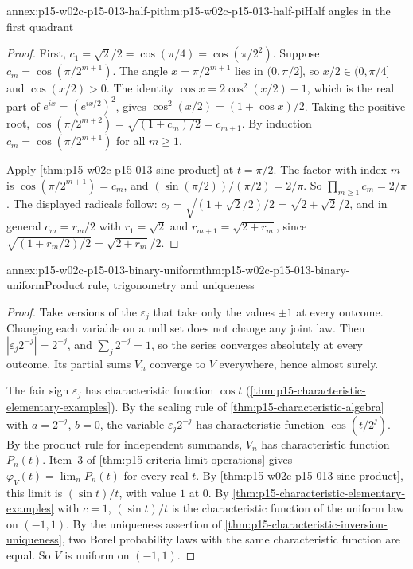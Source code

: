 \begin{annexitem}{annex:p15-w02c-p15-013-half-pi}{thm:p15-w02c-p15-013-half-pi}{Half angles in the first quadrant}
\begin{proof}
First, \(c_1=\sqrt2/2=\cos(\pi/4)=\cos(\pi/2^2)\). Suppose
\(c_m=\cos(\pi/2^{m+1})\). The angle \(x=\pi/2^{m+1}\) lies in
\((0,\pi/2]\), so \(x/2\in(0,\pi/4]\) and \(\cos(x/2)>0\). The identity
\(\cos x=2\cos^2(x/2)-1\), which is the real part of
\(e^{ix}=(e^{ix/2})^2\), gives \(\cos^2(x/2)=(1+\cos x)/2\). Taking the
positive root, \(\cos(\pi/2^{m+2})=\sqrt{(1+c_m)/2}=c_{m+1}\). By induction
\(c_m=\cos(\pi/2^{m+1})\) for all \(m\geq1\).

Apply \cref{thm:p15-w02c-p15-013-sine-product} at \(t=\pi/2\). The factor
with index \(m\) is \(\cos(\pi/2^{m+1})=c_m\), and
\((\sin(\pi/2))/(\pi/2)=2/\pi\). So \(\prod_{m\geq1}c_m=2/\pi\). The displayed
radicals follow: \(c_2=\sqrt{(1+\sqrt2/2)/2}=\sqrt{2+\sqrt2}/2\), and in
general \(c_m=r_m/2\) with \(r_1=\sqrt2\) and \(r_{m+1}=\sqrt{2+r_m}\), since
\(\sqrt{(1+r_m/2)/2}=\sqrt{2+r_m}/2\).
\end{proof}
\end{annexitem}

\begin{annexitem}{annex:p15-w02c-p15-013-binary-uniform}{thm:p15-w02c-p15-013-binary-uniform}{Product rule, trigonometry and uniqueness}
\begin{proof}
Take versions of the \(\varepsilon_j\) that take only the values \(\pm1\)
at every outcome. Changing each variable on a null set does not change
any joint law. Then \(|\varepsilon_j2^{-j}|=2^{-j}\), and
\(\sum_j2^{-j}=1\), so the series converges absolutely at every outcome.
Its partial sums \(V_n\) converge to \(V\) everywhere, hence almost surely.

The fair sign \(\varepsilon_j\) has characteristic function \(\cos t\)
(\cref{thm:p15-characteristic-elementary-examples}). By the scaling rule of
\cref{thm:p15-characteristic-algebra} with \(a=2^{-j}\), \(b=0\), the
variable \(\varepsilon_j2^{-j}\) has characteristic function
\(\cos(t/2^j)\). By the product rule for independent summands, \(V_n\) has
characteristic function \(P_n(t)\). Item~3 of
\cref{thm:p15-criteria-limit-operations} gives
\(\varphi_V(t)=\lim_nP_n(t)\) for every real \(t\). By
\cref{thm:p15-w02c-p15-013-sine-product}, this limit is \((\sin t)/t\), with
value \(1\) at \(0\). By \cref{thm:p15-characteristic-elementary-examples}
with \(c=1\), \((\sin t)/t\) is the characteristic function of the uniform
law on \((-1,1)\). By the uniqueness assertion of
\cref{thm:p15-characteristic-inversion-uniqueness}, two Borel probability
laws with the same characteristic function are equal. So \(V\) is uniform
on \((-1,1)\).
\end{proof}
\end{annexitem}
